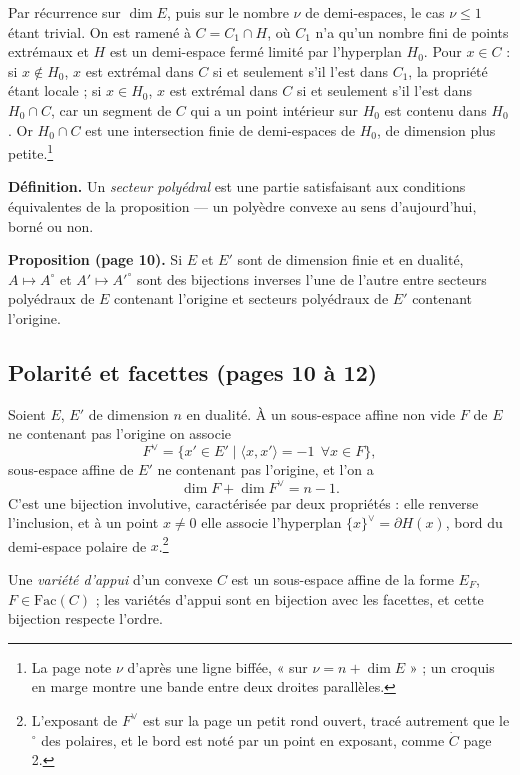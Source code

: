 \documentclass[11pt,a4paper]{article}
\begin{document}
Par récurrence sur $\dim E$, puis sur le nombre $\nu$ de demi-espaces, le cas
$\nu \leq 1$ étant trivial. On est ramené à $C = C_{1} \cap H$, où $C_{1}$ n'a
qu'un nombre fini de points extrémaux et $H$ est un demi-espace fermé limité par
l'hyperplan $H_{0}$. Pour $x \in C$ : si $x \notin H_{0}$, $x$ est extrémal dans
$C$ si et seulement s'il l'est dans $C_{1}$, la propriété étant locale ; si
$x \in H_{0}$, $x$ est extrémal dans $C$ si et seulement s'il l'est dans
$H_{0} \cap C$, car un segment de $C$ qui a un point intérieur sur $H_{0}$ est
contenu dans $H_{0}$. Or $H_{0} \cap C$ est une intersection finie de
demi-espaces de $H_{0}$, de dimension plus petite.\footnote{La page note $\nu$
d'après une ligne biffée, « sur $\nu = n + \dim E$ » ; un croquis en marge
montre une bande entre deux droites parallèles.}

\textbf{Définition.} Un \emph{secteur polyédral} est une partie satisfaisant aux
conditions équivalentes de la proposition --- un polyèdre convexe au sens
d'aujourd'hui, borné ou non.

\textbf{Proposition (page 10).} Si $E$ et $E'$ sont de dimension finie et en
dualité, $A \mapsto A^{\circ}$ et $A' \mapsto A'^{\circ}$ sont des bijections
inverses l'une de l'autre entre secteurs polyédraux de $E$ contenant l'origine
et secteurs polyédraux de $E'$ contenant l'origine.

\subsection*{Polarité et facettes (pages 10 à 12)}

Soient $E$, $E'$ de dimension $n$ en dualité. À un sous-espace affine non vide
$F$ de $E$ ne contenant pas l'origine on associe
\[
  F^{\vee} = \{x' \in E' \mid \langle x, x'\rangle = -1 \ \ \forall x \in F\},
\]
sous-espace affine de $E'$ ne contenant pas l'origine, et l'on a
\[
  \dim F + \dim F^{\vee} = n - 1.
\]
C'est une bijection involutive, caractérisée par deux propriétés : elle renverse
l'inclusion, et à un point $x \neq 0$ elle associe l'hyperplan
$\{x\}^{\vee} = \partial H(x)$, bord du demi-espace polaire de
$x$.\footnote{L'exposant de $F^{\vee}$ est sur la page un petit rond ouvert,
tracé autrement que le $^{\circ}$ des polaires, et le bord est noté par un point
en exposant, comme $\dot{C}$ page 2.}

Une \emph{variété d'appui} d'un convexe $C$ est un sous-espace affine de la forme
$E_{F}$, $F \in \mathrm{Fac}(C)$ ; les variétés d'appui sont en bijection avec
les facettes, et cette bijection respecte l'ordre.
\end{document}
